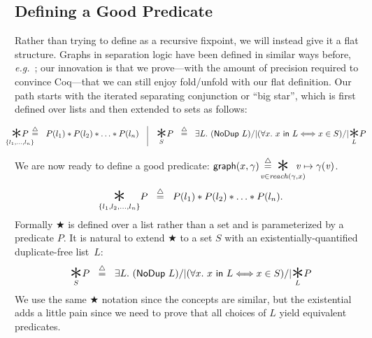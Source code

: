 

\subsection{Defining a Good  Predicate}\label{sec:goodgraph}

Rather than trying to define  as a recursive fixpoint,
we will instead give it a flat structure.  Graphs in separation
logic have been defined in similar ways before, \emph{e.g.}~\citet{ilya-graphs};
our innovation is that we prove---with the amount of precision
required to convince Coq---that we can still enjoy fold/unfold
with our flat definition.  Our path starts with the iterated
separating conjunction or ``big star'', which is first defined over
lists and then extended to sets as follows:

\vspace{-1em}
\[
\begin{array}{@{}l@{}}
\!\!\!\!\!\!\!\underset{\{l_1,\dots,l_n\}}{\bigstar P}\!\!\!\!\!\!\! ~~ \defeq ~~ P(l_1) *
  P(l_2) * \dots * P(l_n) \quad \vline \quad
\underset{S}{\bigstar} P ~~ \defeq ~~ \exists L.~ (\p{NoDup}\ L) /| (\forall x.~ x\ \p{in}\ L <=> x \in S) /| \underset{L}{\bigstar}P
\end{array}
\]

We are now ready to define a good  predicate:
  \quad $\p{graph}(x, \gamma) \; \defeq \; \!\!\!\!\!\!\!\!\!\!\underset{\m{v} \in \mathit{reach}(\gamma, x)}{\bigstar}\!\!\!\!\!\!\m{v}\mapsto\gamma(\m{v})$.
\iffalse
\begin{equation*}
  \underset{\{l_1, l_2,\dots,l_n\}}{\bigstar}P ~~ \defeq ~~ P(l_1) *
  P(l_2) * \dots * P(l_n).
\end{equation*}
Formally $\bigstar$ is defined over a list rather than a set and is parameterized by a predicate $P$.  It is natural to extend $\bigstar$ to a set $S$ with an existentially-quantified duplicate-free list~$L$:
\[
\underset{S}{\bigstar} P ~~ \defeq ~~ \exists L.~ (\p{NoDup}\ L) /| (\forall x.~ x\ \p{in}\ L <=> x \in S) /| \underset{L}{\bigstar}P
\]
We use the same $\bigstar$ notation since the concepts are similar, but the existential adds a little pain since we need to prove that all choices of $L$ yield equivalent predicates.

